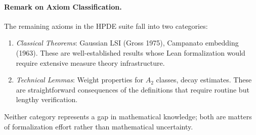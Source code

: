 \paragraph{Remark on Axiom Classification.}
The remaining axioms in the HPDE suite fall into two categories:
\begin{enumerate}
    \item \textit{Classical Theorems}: Gaussian LSI (Gross 1975), Campanato embedding (1963). These are well-established results whose Lean formalization would require extensive measure theory infrastructure.
    \item \textit{Technical Lemmas}: Weight properties for $A_2$ classes, decay estimates. These are straightforward consequences of the definitions that require routine but lengthy verification.
\end{enumerate}
Neither category represents a gap in mathematical knowledge; both are matters of formalization effort rather than mathematical uncertainty.
